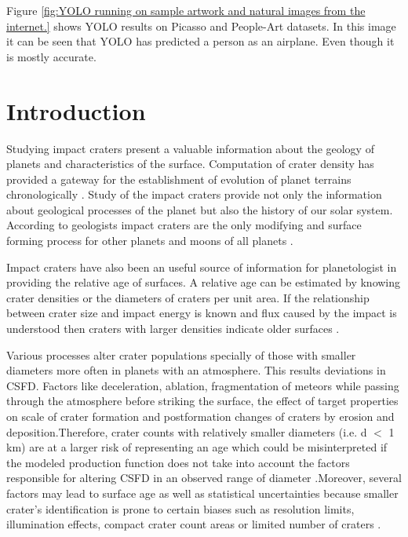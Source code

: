\documentclass[11pt]{article}
\begin{document}
Figure \ref{fig:YOLO running on sample artwork and natural images from the internet.} shows YOLO results on Picasso and People-Art datasets. In this image it can be seen that YOLO has predicted a person as an airplane. Even though it is mostly accurate.
\fi

\section{Introduction}
Studying impact craters present a valuable information about the geology of planets and characteristics of the surface. Computation of crater density has provided a gateway for the establishment of evolution of planet terrains chronologically \cite{martins2009crater}. Study of the impact craters provide not only the information about geological processes of the planet but also the history of our solar system. According to geologists impact craters are the only modifying and surface forming process for other planets and moons of all planets \cite{koeberl1994african}. 

Impact craters have also been an useful source of information for planetologist in providing the relative age of surfaces. A relative age can be estimated by knowing crater densities or the diameters of craters per unit area. If the relationship between crater size and impact energy is known and flux caused by the impact is understood then craters with larger densities indicate older surfaces \cite{ivanov2002comparison}.

Various processes alter crater populations specially of those with smaller diameters \cite{opik1965mariner} more often in planets with an atmosphere. This results deviations in CSFD. Factors like deceleration, ablation, fragmentation of meteors while passing through the atmosphere before striking the surface, the effect of target properties on scale of crater formation and postformation changes of craters by erosion and deposition.Therefore, crater counts with relatively smaller diameters (i.e. d $<$ 1 km) are at a larger risk of representing an age which could be misinterpreted if the modeled production function does not take into account the factors responsible for altering CSFD in an observed range of diameter \cite{hartmann1981chronology}.Moreover, several factors may lead to surface age as well as statistical uncertainties because smaller crater's identification is prone to certain biases such as resolution limits, illumination effects, compact crater count areas or limited number of craters \cite{soderblom1970distribution}.
\end{document}
